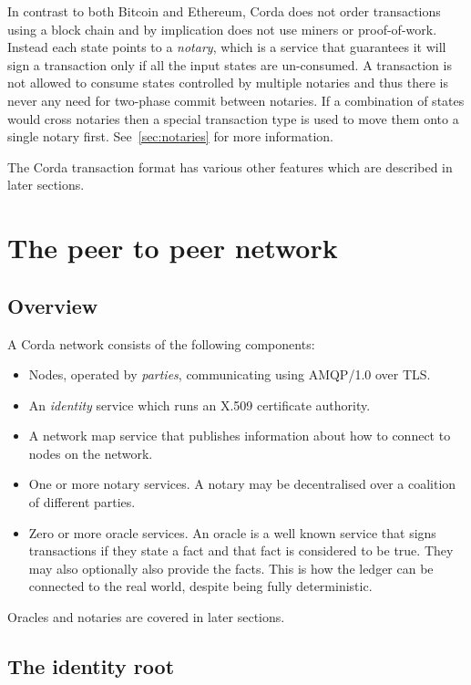 \documentclass{article}
\begin{document}
In contrast to both Bitcoin and Ethereum, Corda does not order transactions using a block chain and by implication
does not use miners or proof-of-work. Instead each state points to a \emph{notary}, which is a service that
guarantees it will sign a transaction only if all the input states are un-consumed. A transaction is not allowed to
consume states controlled by multiple notaries and thus there is never any need for two-phase commit between
notaries. If a combination of states would cross notaries then a special transaction type is used to move them onto
a single notary first. See~\cref{sec:notaries} for more information.

The Corda transaction format has various other features which are described in later sections.

\section{The peer to peer network}

\subsection{Overview}

A Corda network consists of the following components:

\begin{itemize}
\item Nodes, operated by \emph{parties}, communicating using AMQP/1.0 over TLS.
\item An \emph{identity} service which runs an X.509 certificate authority.
\item A network map service that publishes information about how to connect to nodes on the network.
\item One or more notary services. A notary may be decentralised over a coalition of different parties.
\item Zero or more oracle services. An oracle is a well known service that signs transactions if they state a fact
and that fact is considered to be true. They may also optionally also provide the facts. This is how the ledger can be
connected to the real world, despite being fully deterministic.
\end{itemize}


Oracles and notaries are covered in later sections.

\subsection{The identity root}\label{subsec:the-identity-root}
\end{document}
